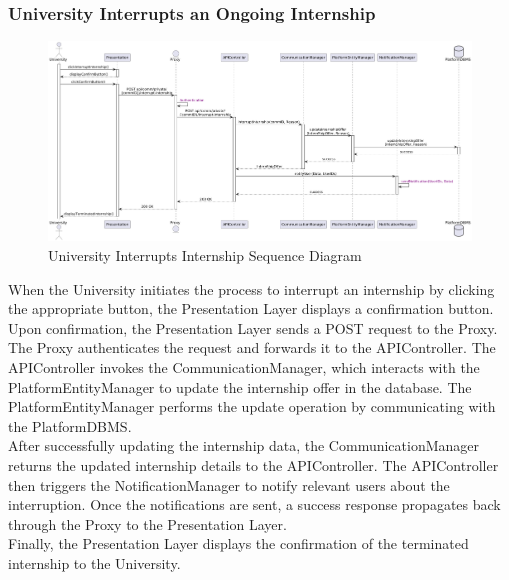 \subsubsection*{University Interrupts an Ongoing Internship}
\begin{figure}[H]
    \centering
    \includegraphics[width=\linewidth]{Latex/Images/DD/SequenceDiagrams/19UniversityInterruptsIntership.png}
    \caption{ University Interrupts Internship Sequence Diagram}
    \label{fig:unintint}
\end{figure}
When the University initiates the process to interrupt an internship by clicking the appropriate button, the Presentation Layer displays a confirmation button. Upon confirmation, the Presentation Layer sends a POST request to the Proxy.\\
The Proxy authenticates the request and forwards it to the APIController. The APIController invokes the CommunicationManager, which interacts with the PlatformEntityManager to update the internship offer in the database. The PlatformEntityManager performs the update operation by communicating with the PlatformDBMS.\\
After successfully updating the internship data, the CommunicationManager returns the updated internship details to the APIController. The APIController then triggers the NotificationManager to notify relevant users about the interruption. Once the notifications are sent, a success response propagates back through the Proxy to the Presentation Layer.\\
Finally, the Presentation Layer displays the confirmation of the terminated internship to the University.

